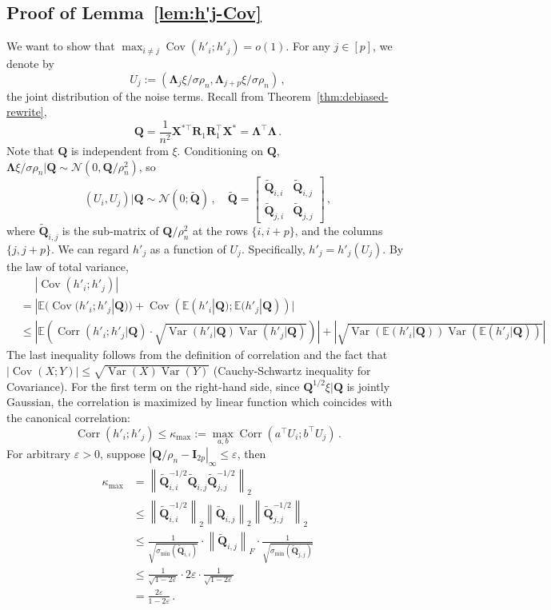 \documentclass[11pt]{article}
\DeclareMathOperator{\Var}{Var}
\DeclareMathOperator{\Cov}{Cov}
\DeclareMathOperator{\Corr}{Corr}
\newcommand{\bX}{\boldsymbol{X}}
\newcommand{\bI}{\boldsymbol{I}}
\newcommand{\bR}{\boldsymbol{R}}
\newcommand{\bQ}{\boldsymbol{Q}}
\newcommand{\bLambda}{\boldsymbol{\Lambda}}
\newcommand{\mcN}{\mathcal{N}}
\newcommand{\Expected}{\mathbb{E}}
\begin{document}
\subsection{Proof of Lemma~\ref{lem:h'j-Cov}}
We want to show that $\max_{i\neq j}\Cov(h'_i;h'_j) = o(1)$. For any $j\in[p]$, we denote by 
\[
U_j:= (\bLambda_j\xi/\sigma\rho_n,\bLambda_{j+p}\xi/\sigma\rho_n)\,,
\]
the joint distribution of the noise terms. Recall from Theorem~\ref{thm:debiased-rewrite},
\[
\bQ=\frac{1}{n^2}\bX^{*\top}\bR_1\bR_1^\top\bX^*=\bLambda^\top\bLambda\,.
\]
Note that $\bQ$ is independent from $\xi$. Conditioning on $\bQ$, $\bLambda\xi/\sigma\rho_n|\bQ \sim \mcN(0, \bQ/\rho_n^2)$, so 
\[
(U_i,U_j)|\bQ \sim \mcN(0;\widetilde{\bQ})\,,\quad\widetilde{\bQ}=\begin{bmatrix}
    \widetilde{\bQ}_{i,i} & \widetilde{\bQ}_{i,j}\\
    \widetilde{\bQ}_{j,i} & \widetilde{\bQ}_{j,j}
\end{bmatrix}\,,
\]
where $\widetilde{\bQ}_{i,j}$ is the sub-matrix of $\bQ/\rho_n^2$ at the rows $\{i,i+p\}$, and the columns $\{j,j+p\}$. We can regard $h'_j$ as a function of $U_j$. Specifically, $h'_j = h'_j(U_j)$. By the law of total variance,
\begin{align}\label{eq:law-total-var}
    &\quad\,\, |\Cov(h'_i;h'_j)|\nonumber \\
    &=|\Expected(\Cov(h'_i;h'_j|\bQ)) + \Cov(\Expected(h'_i|\bQ);\Expected(h'_j|\bQ))|\nonumber\\
    &\le\left|\Expected\left(\Corr(h'_i;h'_j|\bQ)\cdot\sqrt{\Var(h'_i|\bQ)\Var(h'_j|\bQ)}\right)\right| + \left|\sqrt{\Var(\Expected(h'_i|\bQ))\Var(\Expected(h'_j|\bQ))}\right|
\end{align}
The last inequality follows from the definition of correlation and the fact that $|\Cov(X;Y)|\le\sqrt{\Var(X)\Var(Y)}$ (Cauchy-Schwartz inequality for Covariance). For the first term on the right-hand side, since $\bQ^{1/2}\xi|\bQ$ is jointly Gaussian, the correlation is maximized by linear function which coincides with the canonical correlation:
\[
\Corr(h'_i;h'_j)\le \kappa_{\max} := \max_{a,b}\Corr(a^\top U_i;b^\top U_j)\,.
\]
For arbitrary $\varepsilon>0$, suppose $|\bQ/\rho_n-\bI_{2p}|_\infty \le \varepsilon$, then 
\begin{align*}
    \kappa_{\max} &= \left\|\widetilde{\bQ}_{i,i}^{-1/2}\widetilde{\bQ}_{i,j}\widetilde{\bQ}_{j,j}^{-1/2}\right\|_2\\
    &\le  \left\|\widetilde{\bQ}_{i,i}^{-1/2}\right\|_2\left\|\widetilde{\bQ}_{i,j}\right\|_2\left\|\widetilde{\bQ}_{j,j}^{-1/2}\right\|_2\\
    &\le  \frac{1}{\sqrt{\sigma_{\min}(\widetilde{\bQ}_{i,i})}} \cdot\left\|\widetilde{\bQ}_{i,j}\right\|_F\cdot \frac{1}{\sqrt{\sigma_{\min}(\widetilde{\bQ}_{j,j})}}\\
    &\le \frac{1}{\sqrt{1-2\varepsilon}}\cdot 2\varepsilon\cdot \frac{1}{\sqrt{1-2\varepsilon}}\\
    &=  \frac{2\varepsilon}{1-2\varepsilon}\,.
\end{align*}
\end{document}
